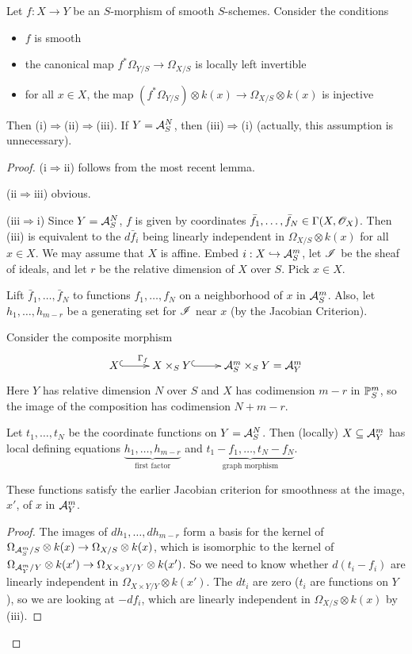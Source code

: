 \begin{proposition}
 Let $f:X\to Y$ be an $S$-morphism of smooth $S$-schemes.
 Consider the conditions
 \begin{itemize}
 \item[(i)] $f$ is smooth
 \item[(ii)] the canonical map $f^*\Omega_{Y/S} \to \Omega_{X/S}$
 is locally left invertible
 \item[(iii)] for all $x\in X$, the map $(f^*\Omega_{Y/S})\otimes
 k(x) \to \Omega_{X/S}\otimes k(x)$ is injective
 \end{itemize}
 Then (i)$\Rightarrow$(ii)$\Rightarrow$(iii).  If $Y=\A^N_S$, then
 (iii)$\Rightarrow$(i) (actually, this assumption is unnecessary).
 \end{proposition}
 \begin{proof}
 (i$\Rightarrow$ii) follows from the most recent lemma.

 (ii$\Rightarrow$iii) obvious.

 (iii$\Rightarrow$i) Since $Y=\A^N_S$, $f$ is given by coordinates
 $\bar f_1,\dots, \bar f_N\in \Gamma(X,\O_X)$.  Then (iii) is equivalent to
 the $d\bar f_i$ being linearly independent in $\Omega_{X/S}\otimes
 k(x)$ for all $x\in X$.  We may assume that $X$ is affine.
 Embed $i:X\hookrightarrow \A^m_S$, let $\I$ be the sheaf of
 ideals, and let $r$ be the relative dimension of $X$ over $S$.
 Pick $x\in X$.

 Lift $\bar f_1,\dots,\bar f_N$ to functions $f_1,\dots, f_N$ on a
 neighborhood of $x$ in $\A^m_S$.  Also, let $h_1,\dots, h_{m-r}$
 be a generating set for $\I$ near $x$ (by the Jacobian
 Criterion).

 Consider the composite morphism
 \[\xymatrix{
    X\ar@{^(->}[r]^{\Gamma_f}& X\times_S Y \ar@{^(->}[r] &
    \A^m_S\times_S Y = \A^m_Y
 }\]
 Here $Y$ has relative dimension $N$ over $S$ and $X$ has
 codimension $m-r$ in $\P^m_S$, so the image of the composition
 has codimension $N+m-r$.

 Let $t_1,\dots, t_N$ be the coordinate functions on $Y=\A^N_S$.
 Then (locally) $X\subseteq \A^m_Y$ has local defining equations
 $\underbrace{h_1,\dots, h_{m-r}}_{\text{first factor}}$ and
 $\underbrace{t_1-f_1,\dots,t_N-f_N}_{\text{graph morphism}}$.
 \begin{claim}
 These functions satisfy the earlier Jacobian criterion for
 smoothness at the image, $x'$, of $x$ in $\A^m_Y$.
 \end{claim}
 \begin{proof}
 The images of $dh_1,\dots, dh_{m-r}$ form a basis for the kernel
 of $\Omega_{\A^m_S/S}\otimes k(x)\to \Omega_{X/S}\otimes k(x)$,
 which is isomorphic to the kernel of $\Omega_{\A^m_Y/Y}\otimes
 k(x') \to \Omega_{X\times_S Y/Y}\otimes k(x')$.  So we need to
 know whether $d(t_i-f_i)$ are linearly independent in
 $\Omega_{X\times Y/Y}\otimes k(x')$.  The $dt_i$ are zero ($t_i$
 are functions on $Y$), so we are looking at $-df_i$, which are
 linearly independent in $\Omega_{X/S}\otimes k(x)$ by (iii).
 \renewcommand{\qedsymbol}{$\square_{\text{Claim}}$}
 \end{proof}
 \end{proof}

